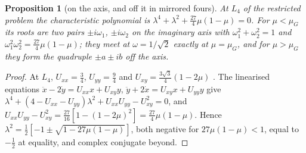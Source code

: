 \documentclass[11pt]{article}
\newtheorem{proposition}[theorem]{Proposition}
\theoremstyle{definition}\newtheorem{definition}[theorem]{Definition}
\theoremstyle{remark}\newtheorem{remark}[theorem]{Remark}
\begin{document}
\begin{proposition}[on the axis, and off it in mirrored fours]\label{prop:krein}
At $L_4$ of the restricted problem the characteristic polynomial is $\lambda^4+\lambda^2+\frac{27}4\mu(1-\mu)=0$. For $\mu<\mu_G$ its roots are two pairs $\pm i\omega_1$, $\pm i\omega_2$ on the imaginary axis with $\omega_1^2+\omega_2^2=1$ and $\omega_1^2\omega_2^2=\frac{27}4\mu(1-\mu)$; they meet at $\omega=1/\sqrt2$ exactly at $\mu=\mu_G$, and for $\mu>\mu_G$ they form the quadruple $\pm a\pm ib$ off the axis.
\end{proposition}
\begin{proof}
At $L_4$, $U_{xx}=\frac34$, $U_{yy}=\frac94$ and $U_{xy}=\frac{3\sqrt3}4(1-2\mu)$ \cite{MD}. The linearised equations $\ddot x-2\dot y=U_{xx}x+U_{xy}y$, $\ddot y+2\dot x=U_{xy}x+U_{yy}y$ give $\lambda^4+(4-U_{xx}-U_{yy})\lambda^2+U_{xx}U_{yy}-U_{xy}^2=0$, and $U_{xx}U_{yy}-U_{xy}^2=\frac{27}{16}[1-(1-2\mu)^2]=\frac{27}4\mu(1-\mu)$. Hence $\lambda^2=\frac12[-1\pm\sqrt{1-27\mu(1-\mu)}]$, both negative for $27\mu(1-\mu)<1$, equal to $-\frac12$ at equality, and complex conjugate beyond.
\end{proof}
\end{document}
